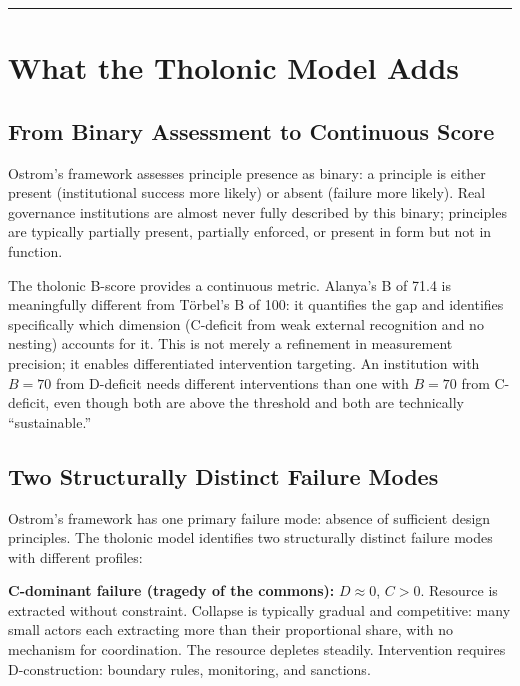 \documentclass[12pt]{article}
\begin{document}
\begin{center}\rule{0.5\linewidth}{0.5pt}\end{center}

\section{What the Tholonic Model Adds}\label{what-the-tholonic-model-adds}

\subsection{From Binary Assessment to Continuous Score}\label{from-binary-assessment-to-continuous-score}

Ostrom's framework assesses principle presence as binary: a principle is
either present (institutional success more likely) or absent (failure
more likely). Real governance institutions are almost never fully
described by this binary; principles are typically partially present,
partially enforced, or present in form but not in function.

The tholonic B-score provides a continuous metric. Alanya's B of 71.4 is
meaningfully different from Törbel's B of 100: it quantifies the gap and
identifies specifically which dimension (C-deficit from weak external
recognition and no nesting) accounts for it. This is not merely a
refinement in measurement precision; it enables differentiated
intervention targeting. An institution with \(B = 70\) from D-deficit
needs different interventions than one with \(B = 70\) from C-deficit,
even though both are above the threshold and both are technically
``sustainable.''

\subsection{Two Structurally Distinct Failure Modes}\label{two-structurally-distinct-failure-modes}

Ostrom's framework has one primary failure mode: absence of sufficient
design principles. The tholonic model identifies two structurally
distinct failure modes with different profiles:

\textbf{C-dominant failure (tragedy of the commons):} \(D \approx 0\),
\(C > 0\). Resource is extracted without constraint. Collapse is
typically gradual and competitive: many small actors each extracting
more than their proportional share, with no mechanism for coordination.
The resource depletes steadily. Intervention requires D-construction:
boundary rules, monitoring, and sanctions.
\end{document}
